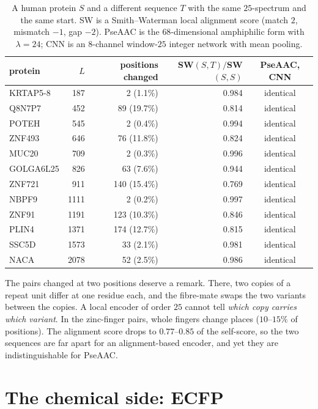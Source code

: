 \begin{table}[t]
\centering\small
\begin{tabular}{lrrrc}
\toprule
protein & $L$ & positions changed & SW$(S,T)/$SW$(S,S)$ & PseAAC, CNN\\
\midrule
KRTAP5-8 & 187 & 2 (1.1\%) & 0.984 & identical\\
Q8N7P7 & 452 & 89 (19.7\%) & 0.814 & identical\\
POTEH & 545 & 2 (0.4\%) & 0.994 & identical\\
ZNF493 & 646 & 76 (11.8\%) & 0.824 & identical\\
MUC20 & 709 & 2 (0.3\%) & 0.996 & identical\\
GOLGA6L25 & 826 & 63 (7.6\%) & 0.944 & identical\\
ZNF721 & 911 & 140 (15.4\%) & 0.769 & identical\\
NBPF9 & 1111 & 2 (0.2\%) & 0.997 & identical\\
ZNF91 & 1191 & 123 (10.3\%) & 0.846 & identical\\
PLIN4 & 1371 & 174 (12.7\%) & 0.815 & identical\\
SSC5D & 1573 & 33 (2.1\%) & 0.981 & identical\\
NACA & 2078 & 52 (2.5\%) & 0.986 & identical\\
\bottomrule
\end{tabular}
\caption{A human protein $S$ and a different sequence $T$ with the same $25$-spectrum and the same
start. SW is a Smith--Waterman local alignment score (match $2$, mismatch $-1$, gap $-2$). PseAAC is the $68$-dimensional amphiphilic form with $\lambda=24$; CNN is an
$8$-channel window-$25$ integer network with mean pooling.}\label{ch12:tab:mates}
\end{table}

The pairs changed at two positions deserve a remark. There, two copies of a repeat unit differ at
one residue each, and the fibre-mate swaps the two variants between the copies. A local encoder of
order $25$ cannot tell \emph{which copy carries which variant}. In the zinc-finger pairs, whole
fingers change places ($10$--$15\%$ of positions). The alignment score drops to $0.77$--$0.85$ of the
self-score, so the two sequences are far apart for an alignment-based encoder, and yet they are
indistinguishable for PseAAC.

\section{The chemical side: ECFP}\label{ch12:sec:ecfp}

